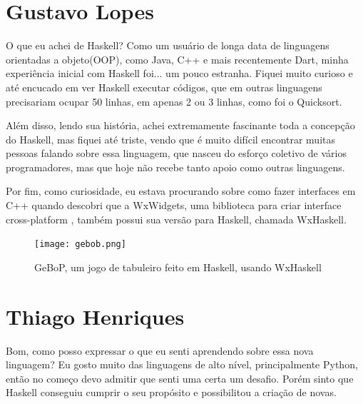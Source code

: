 \documentclass[
  article,			       %
  12pt,				         %
  oneside,			       %
  a4paper,			       %
  english,		       	 %
  brazil,			      	 %
  sumario=tradicional
]{abntex2}
\begin{document}
    
    \begin{apendicesenv}
      
        \partapendices

        \setcounter{chapter}{0}
        \renewcommand{\thechapter}{\Alph{chapter}}%

        \chapter{Gustavo Lopes}

        O que eu achei de Haskell? Como um usuário de longa data de linguagens orientadas a objeto(OOP), 
        como Java, C++ e mais recentemente Dart, minha experiência inicial com Haskell foi...
        um pouco estranha. Fiquei muito curioso e até encucado em ver Haskell executar códigos, que em
        outras linguagens precisariam ocupar 50 linhas, em apenas 2 ou 3 linhas, como foi o Quicksort.

        Além disso, lendo sua história, achei extremamente fascinante toda a concepção do Haskell,
        mas fiquei até triste, vendo que é muito difícil encontrar muitas pessoas falando sobre essa linguagem, que nasceu 
        do esforço coletivo de vários programadores, mas que hoje não recebe tanto apoio como outras linguagens.

        Por fim, como curiosidade, eu estava procurando sobre como fazer interfaces em C++ quando
        descobri que a WxWidgets, uma biblioteca para criar interface cross-platform , também possui 
        sua versão para Haskell, chamada WxHaskell.

        \begin{figure}[ht]
          \texttt{[image: gebob.png]}
          \caption{GeBoP, um jogo de tabuleiro feito em Haskell, usando WxHaskell}
        \end{figure}

        \newpage
        
        \chapter{Thiago Henriques}

        Bom, como posso expressar o que eu senti aprendendo sobre essa nova linguagem? Eu gosto muito das linguagens de alto nível, principalmente Python,
        então no começo devo admitir que senti uma certa um desafio. Porém sinto que Haskell conseguiu cumprir o 
        seu propósito e possibilitou a criação de novas.


\end{apendicesenv}
\end{document}
